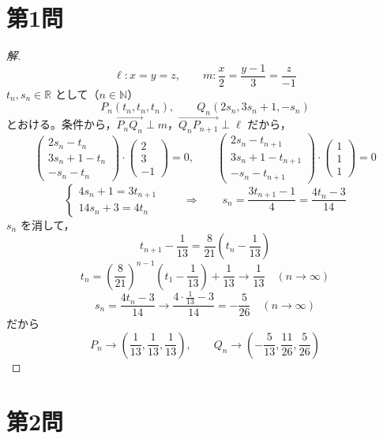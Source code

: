 \documentclass[../main.tex]{subfiles}
\begin{document}
\section*{第1問}

\begin{proof}[解]
  \[
    \ell: x=y=z, \qquad m: \frac{x}{2}=\frac{y-1}{3}=\frac{z}{-1}
  \]
  $t_n,s_n\in\mathbb{R}$ として（$n\in\mathbb{N}$）
  \[
    P_n(t_n,t_n,t_n), \qquad Q_n(2s_n,3s_n+1,-s_n)
  \]
  とおける。条件から，$\overrightarrow{P_nQ_n}\perp m$，$\overrightarrow{Q_nP_{n+1}}\perp\ell$ だから，
  \[
    \begin{pmatrix}2s_n-t_n\\3s_n+1-t_n\\-s_n-t_n
    \end{pmatrix}\cdot
    \begin{pmatrix}2\\3\\-1
    \end{pmatrix}=0, \qquad
    \begin{pmatrix}2s_n-t_{n+1}\\3s_n+1-t_{n+1}\\-s_n-t_{n+1}
    \end{pmatrix}\cdot
    \begin{pmatrix}1\\1\\1
    \end{pmatrix}=0
  \]
  \[
    \begin{cases}
      4s_n+1=3t_{n+1} \\
      14s_n+3=4t_n
    \end{cases}
    \qquad\Longrightarrow\qquad
    s_n=\frac{3t_{n+1}-1}{4}=\frac{4t_n-3}{14}
  \]
  $s_n$ を消して，
  \[
    t_{n+1}-\frac{1}{13}=\frac{8}{21}\left(t_n-\frac{1}{13}\right)
  \]
  \[
    t_n=\left(\frac{8}{21}\right)^{n-1}\left(t_1-\frac{1}{13}\right)+\frac{1}{13} \longrightarrow \frac{1}{13} \quad (n\to\infty)
  \]
  \[
    s_n=\frac{4t_n-3}{14} \longrightarrow \frac{4\cdot\frac{1}{13}-3}{14}=-\frac{5}{26} \quad (n\to\infty)
  \]
  だから
  \[
    P_n\to\left(\frac{1}{13},\frac{1}{13},\frac{1}{13}\right), \qquad Q_n\to\left(-\frac{5}{13},\frac{11}{26},\frac{5}{26}\right)
  \]
\end{proof}

\newpage

\section*{第2問}
\end{document}
